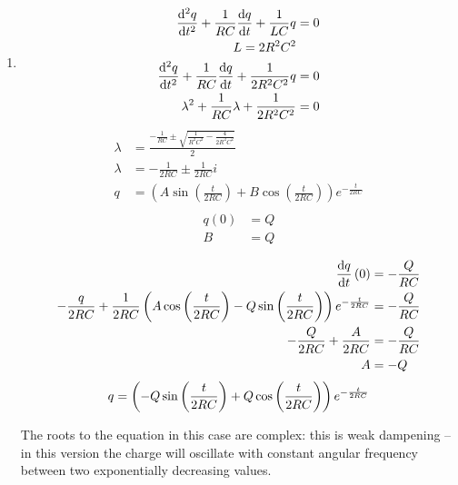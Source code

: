 \documentclass[10pt,\jkfside,a4paper]{article}
\begin{document}
\begin{enumerate}
\begin{enumerate}
\item
\begin{equation}
\begin{split}
\dv[2]{q}{t} + \frac{1}{RC}\dv{q}{t} + \frac{1}{LC}q &= 0\\
L = 2R^2C^2&\\
\dv[2]{q}{t} + \frac{1}{RC}\dv{q}{t} + \frac{1}{2R^2C^2}q &= 0\\
\lambda^2 + \frac{1}{RC}\lambda + \frac{1}{2R^2C^2} &= 0\\
\end{split}
\end{equation}
\begin{equation}
\begin{split}
\lambda &= \frac{-\frac{1}{RC} \pm \sqrt{\frac{1}{R^2C^2} - \frac{4}{2R^2C^2}}}{2}\\
\lambda &= -\frac{1}{2RC} \pm \frac{1}{2RC}i\\
q &= \left(A \sin{\left(\frac{t}{2RC}\right)} + B\cos{\left(\frac{t}{2RC}\right)}\right)e^{-\frac{t}{2RC}}\\
\end{split}
\end{equation}
\begin{equation}
\begin{split}
q(0) &= Q\\
B &= Q\\
\end{split}
\end{equation}
\begin{equation}
\begin{split}
\dv{q}{t}\left(0\right) &= -\frac{Q}{RC}\\
-\frac{q}{2RC} + \frac{1}{2RC}\left(A\cos\left(\frac{t}{2RC}\right) - Q\sin\left(\frac{t}{2RC}\right)\right)e^{-\frac{t}{2RC}} &= -\frac{Q}{RC}\\
-\frac{Q}{2RC} + \frac{A}{2RC} &= -\frac{Q}{RC}\\
A &= -Q\\
\end{split}
\end{equation}
\begin{equation}
q = \left(-Q \sin{\left(\frac{t}{2RC}\right)} + Q\cos{\left(\frac{t}{2RC}\right)}\right)e^{-\frac{t}{2RC}}\\
\end{equation}

The roots to the equation in this case are complex: this is weak dampening -- in this version the charge will oscillate with constant 
angular frequency between two exponentially decreasing values.


\end{enumerate}
\end{enumerate}
\end{document}
